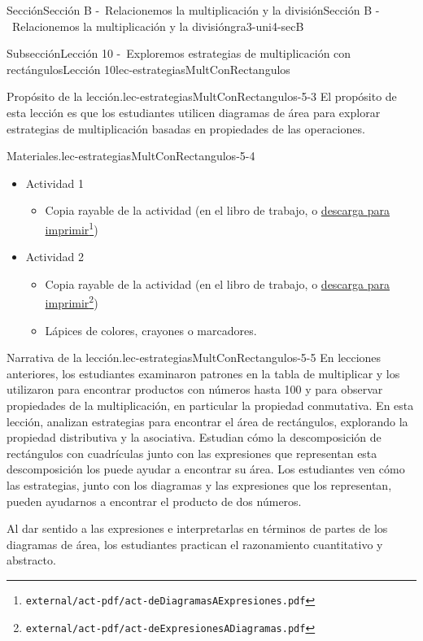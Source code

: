 \documentclass[oneside,10pt,]{article}
\begin{document}
\begin{sectionptx}{Sección}{Sección B -~Relacionemos la multiplicación y la división}{}{Sección B -~Relacionemos la multiplicación y la división}{}{}{gra3-uni4-secB}
\begin{subsectionptx}{Subsección}{Lección 10 -~Exploremos estrategias de multiplicación con rectángulos}{}{Lección 10}{}{}{lec-estrategiasMultConRectangulos}
\begin{introduction}{}
\begin{paragraphs}{Propósito de la lección.}{lec-estrategiasMultConRectangulos-5-3}
El propósito de esta lección es que los estudiantes utilicen diagramas de área para explorar estrategias de multiplicación basadas en propiedades de las operaciones.%
\end{paragraphs}%
\begin{paragraphs}{Materiales.}{lec-estrategiasMultConRectangulos-5-4}%
%
\begin{itemize}[label=\textbullet]
\item{}Actividad 1%
%
\begin{itemize}[label=$\circ$]
\item{}Copia rayable de la actividad (en el libro de trabajo, o \href{external/act-pdf/act-deDiagramasAExpresiones.pdf}{descarga para imprimir}\footnote{\nolinkurl{external/act-pdf/act-deDiagramasAExpresiones.pdf}\label{lec-estrategiasMultConRectangulos-5-4-2-1-2-1-2}})%
\end{itemize}
\item{}Actividad 2%
%
\begin{itemize}[label=$\circ$]
\item{}Copia rayable de la actividad (en el libro de trabajo, o \href{external/act-pdf/act-deExpresionesADiagramas.pdf}{descarga para imprimir}\footnote{\nolinkurl{external/act-pdf/act-deExpresionesADiagramas.pdf}\label{lec-estrategiasMultConRectangulos-5-4-2-2-2-1-2}})%
\item{}Lápices de colores, crayones o marcadores.%
\end{itemize}
\end{itemize}
\end{paragraphs}%
\begin{paragraphs}{Narrativa de la lección.}{lec-estrategiasMultConRectangulos-5-5}%
En lecciones anteriores, los estudiantes examinaron patrones en la tabla de multiplicar y los utilizaron para encontrar productos con números hasta 100 y para observar propiedades de la multiplicación, en particular la propiedad conmutativa. En esta lección, analizan estrategias para encontrar el área de rectángulos, explorando la propiedad distributiva y la asociativa. Estudian cómo la descomposición de rectángulos con cuadrículas junto con las expresiones que representan esta descomposición los puede ayudar a encontrar su área. Los estudiantes ven cómo las estrategias, junto con los diagramas y las expresiones que los representan, pueden ayudarnos a encontrar el producto de dos números.%
\par
Al dar sentido a las expresiones e interpretarlas en términos de partes de los diagramas de área, los estudiantes practican el razonamiento cuantitativo y abstracto.%

\end{paragraphs}
\end{introduction}
\end{subsectionptx}
\end{sectionptx}
\end{document}
